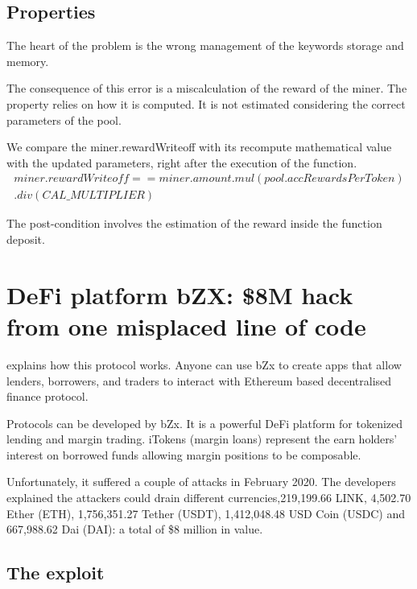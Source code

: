 \subsection{Properties}
The heart of the problem is the wrong management of the keywords storage and memory. 

The consequence of this error is a miscalculation of the reward of the miner.
The property relies on how it is computed. It is not estimated considering the correct parameters of the pool. 



We compare the miner.rewardWriteoff with its recompute mathematical value with the updated parameters, 
right after the execution of the function. 
\begin{equation}
    \begin{split}
    miner.rewardWriteoff == miner.amount.mul(pool.accRewardsPerToken) \\ .div(CAL\_MULTIPLIER)
    \end{split}
\end{equation}

The post-condition involves the estimation of the reward inside the function deposit.

\section{DeFi platform bZX: \$8M hack from one misplaced line of code}
\label{sec:Exploits:bZX}

\citet{bZxProtocol} explains how this protocol works. 
Anyone can use bZx to create apps that allow lenders, borrowers, and traders to interact with Ethereum based 
decentralised finance protocol.

Protocols can be developed by bZx. 
It is a powerful DeFi platform for tokenized lending and margin trading. 
iTokens (margin loans) represent the earn holders' interest on borrowed funds allowing margin positions to be composable.

Unfortunately, it suffered a couple of attacks in February 2020.
The developers explained the attackers could drain different currencies,219,199.66 LINK, 4,502.70 Ether (ETH), 1,756,351.27 Tether (USDT), 
1,412,048.48 USD Coin (USDC) and 667,988.62 Dai (DAI): a total of \$8 million in value. 

\subsection{The exploit}

